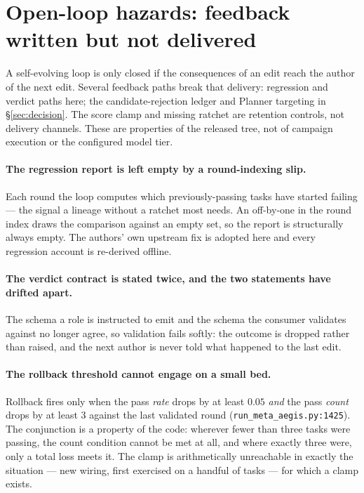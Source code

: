\section{Open-loop hazards: feedback written but not delivered}
\label{sec:open-loop}

A self-evolving loop is only closed if the consequences of an edit reach
the author of the next edit. Several feedback paths break that delivery:
regression and verdict paths here; the candidate-rejection ledger and
Planner targeting in \S\ref{sec:decision}. The score clamp and missing
ratchet are retention controls, not delivery channels. These are properties
of the released tree, not of campaign execution or the configured model tier.

\paragraph{The regression report is left empty by a round-indexing slip.}
Each round the loop computes which previously-passing tasks have started
failing --- the signal a lineage without a ratchet most needs. An
off-by-one in the round index draws the comparison against an empty set,
so the report is structurally always empty. The authors' own upstream fix
is adopted here and every regression account is re-derived offline.

\paragraph{The verdict contract is stated twice, and the two statements
have drifted apart.} The schema a role is instructed to emit and the schema
the consumer validates against no longer agree, so validation fails
softly: the outcome is dropped rather than raised, and the next author is
never told what happened to the last edit.

\paragraph{The rollback threshold cannot engage on a small bed.} Rollback
fires only when the pass \emph{rate} drops by at least $0.05$ \emph{and}
the pass \emph{count} drops by at least $3$ against the last validated
round (\texttt{run\_meta\_aegis.py:1425}). The conjunction is a property
of the code: wherever fewer than three tasks were passing, the count
condition cannot be met at all, and where exactly three were, only a
total loss meets it. The clamp is arithmetically unreachable in exactly
the situation --- new wiring, first exercised on a handful of tasks ---
for which a clamp exists.

